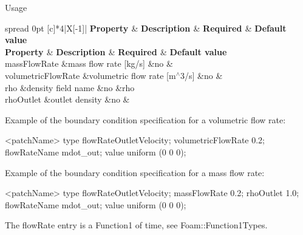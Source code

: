 \begin{DoxyParagraph}{Usage}
\tabulinesep=1mm
\begin{longtabu} spread 0pt [c]{*{4}{|X[-1]}|}
\hline
\rowcolor{\tableheadbgcolor}\PBS\centering \textbf{ {\bfseries  Property } }&\PBS\centering \textbf{ {\bfseries  Description } }&\PBS\centering \textbf{ {\bfseries  Required } }&\PBS\centering \textbf{ {\bfseries  Default value}  }\\
\endfirsthead
\hline
\endfoot
\hline
\rowcolor{\tableheadbgcolor}\PBS\centering \textbf{ {\bfseries  Property } }&\PBS\centering \textbf{ {\bfseries  Description } }&\PBS\centering \textbf{ {\bfseries  Required } }&\PBS\centering \textbf{ {\bfseries  Default value}  }\\
\endhead
{\ttfamily mass\+Flow\+Rate}  &mass flow rate \mbox{[}kg/s\mbox{]}  &no  &\\
{\ttfamily volumetric\+Flow\+Rate}  &volumetric flow rate \mbox{[}m$^\wedge$3/s\mbox{]} &no  &\\
{\ttfamily rho}  &density field name  &no  &rho  \\
{\ttfamily rho\+Outlet}  &outlet density  &no  &\\
\end{longtabu}
\begin{DoxyVerb}Example of the boundary condition specification for a volumetric flow rate:
\end{DoxyVerb}
 \begin{DoxyVerb}    <patchName>
    {
        type                flowRateOutletVelocity;
        volumetricFlowRate  0.2;
        flowRateName        mdot_out;
        value               uniform (0 0 0);
    }\end{DoxyVerb}

\end{DoxyParagraph}
Example of the boundary condition specification for a mass flow rate\+: \begin{DoxyVerb}    <patchName>
    {
        type                flowRateOutletVelocity;
        massFlowRate        0.2;
        rhoOutlet           1.0;
        flowRateName        mdot_out;
        value               uniform (0 0 0);
    }\end{DoxyVerb}


The {\ttfamily flow\+Rate} entry is a {\ttfamily Function1} of time, see Foam\+::\+Function1\+Types.

